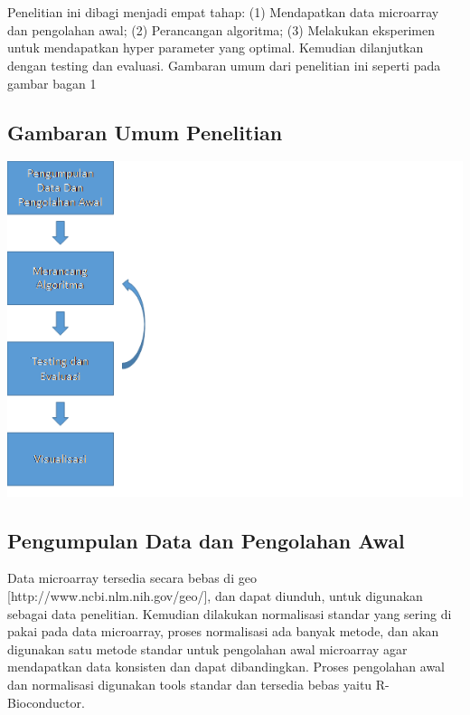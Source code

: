 \chapter{\babTiga}

Penelitian ini dibagi menjadi empat tahap: (1) Mendapatkan data microarray dan pengolahan awal; (2) Perancangan algoritma; (3) Melakukan eksperimen untuk mendapatkan hyper parameter yang optimal. Kemudian dilanjutkan dengan  testing dan evaluasi. Gambaran umum dari penelitian ini seperti pada gambar bagan 1


\section{Gambaran Umum Penelitian}

\includegraphics[scale=1]{pics/gbr3_1.png} 


\section{Pengumpulan Data dan Pengolahan Awal}
Data microarray tersedia secara bebas di geo [http://www.ncbi.nlm.nih.gov/geo/], dan dapat diunduh, untuk digunakan sebagai data penelitian. Kemudian dilakukan normalisasi standar yang sering di pakai pada data microarray, proses normalisasi ada banyak metode, dan akan digunakan satu metode standar untuk pengolahan awal microarray agar mendapatkan data konsisten dan dapat dibandingkan. Proses pengolahan awal dan normalisasi digunakan tools standar dan tersedia bebas yaitu R-Bioconductor. \\



